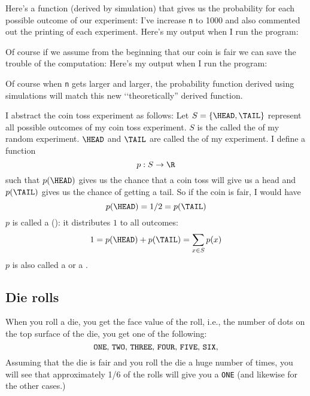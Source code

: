 Here's a function (derived by simulation) 
that gives us the probability for each possible outcome
of our experiment:
I've increase \verb!n! to 1000 and 
also commented out the printing of each experiment.
Here's my output when I run the program:


Of course if we assume from the beginning that our coin is fair we can 
save the trouble of the computation:
Here's my output when I run the program:


Of course when \verb!n! gets larger and larger, the probability function
derived using simulations will match this new \lq\lq theoretically'' derived
function.





I abstract the coin toss experiment as follows:
Let $S = \{\HEAD, \TAIL\}$ represent all possible outcomes of
my coin toss experiment.
$S$ is the called the  of my random experiment.
$\HEAD$ and $\TAIL$ are called
the  of my experiment.
I define a function
\[
  p : S \rightarrow \R 
\]
such that $p(\HEAD)$ gives us the chance that
a coin toss will give us a head and
$p(\TAIL)$ gives us the chance of getting a tail.
So if the coin is fair, I would have
\[
  p(\HEAD) = 1/2 = p(\TAIL)
\]
$p$ is called a
():
it distributes $1$ to all outcomes:
\[
1 = p(\HEAD) + p(\TAIL) = \sum_{x \in S} p(x)
\]
$p$ is also called a
or a 
.




\newpage
\subsection{Die rolls}

When you roll a die, you get the face value of the roll, i.e.,
the number of dots on the top surface of the die, you
get one of the following:
\[
\text{
\texttt{ONE},
\texttt{TWO},
\texttt{THREE},
\texttt{FOUR},
\texttt{FIVE},
\texttt{SIX},
}
\]
Assuming that the die is fair and you roll the die a huge
number of times, you will see that approximately 1/6 of the 
rolls will give you a \texttt{ONE}
(and likewise for the other cases.)

